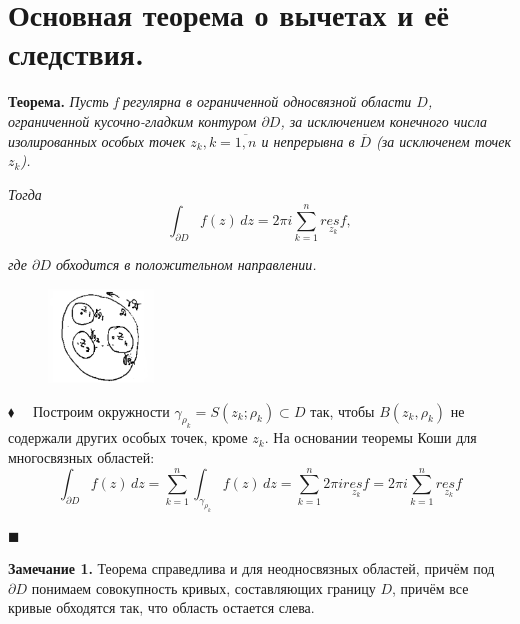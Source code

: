 \documentclass[a4paper, 12pt]{report}
\begin{document}
\section{Основная теорема о вычетах и её следствия.}


\textbf{Теорема.}\quad
\textit{Пусть f регулярна в ограниченной односвязной области $D$, ограниченной кусочно-гладким контуром $\partial D$, за исключением конечного числа изолированных особых точек $z_k,  k=\overline{1,n}$ и непрерывна в $\overline{D}$ (за исключенем точек $z_k$). }
\par\textit{Тогда \[
    \int_{\partial D}  f(z) \,dz = 2\pi i \sum_{k=1}^{n} \underset{\text{$z_k$}}{res f},
\]}
\par\textit{где $\partial D$ обходится в положительном направлении.}
\par\bigskip

\begin{figure}
    \centering
    \includegraphics[width=2.8cm]{b41}
\end{figure}
$\blacklozenge$
$\quad$Построим окружности $\gamma_{\rho_k}=S(z_k;\rho_k)\subset D$
так, чтобы $B(z_k,\rho_k)$ не содержали других особых точек, кроме $z_k$.
На основании теоремы Коши для многосвязных областей:
\[
    \int_{\partial D}  f(z) \,dz =\sum_{k=1}^{n} \int_{\gamma_{\rho_k}}  f(z) \,dz=  \sum_{k=1}^{n}2\pi i \underset{\text{$z_k$}}{res f}= 2\pi i \sum_{k=1}^{n} \underset{\text{$z_k$}}{res f}
\]\begin{flushright}$\blacksquare$\end{flushright}


\textbf{Замечание 1.} \quad
Теорема справедлива и для неодносвязных областей, причём под $\partial D $ понимаем совокупность кривых, составляющих границу $D$, причём все кривые обходятся так, что область остается слева.
\end{document}
